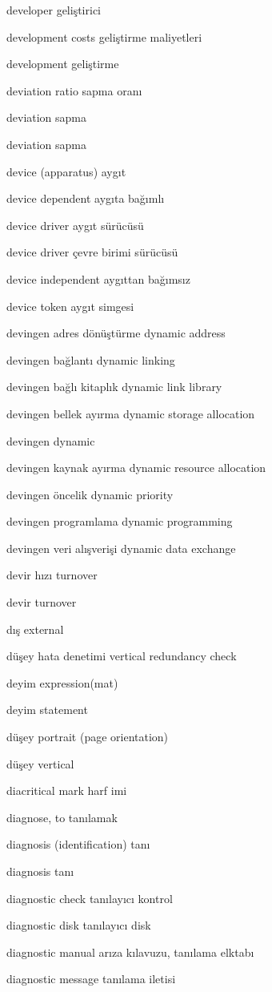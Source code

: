 \documentclass[12pt,fleqn]{article}\usepackage{../../common}
\begin{document}
developer geliştirici

development costs geliştirme maliyetleri

development geliştirme

deviation ratio sapma oranı

deviation sapma

deviation sapma

device (apparatus) aygıt

device dependent aygıta bağımlı

device driver aygıt sürücüsü

device driver çevre birimi sürücüsü

device independent aygıttan bağımsız

device token aygıt simgesi

devingen adres dönüştürme dynamic address

devingen bağlantı dynamic linking

devingen bağlı kitaplık dynamic link library

devingen bellek ayırma dynamic storage allocation

devingen dynamic

devingen kaynak ayırma dynamic resource allocation

devingen öncelik dynamic priority

devingen programlama dynamic programming

devingen veri alışverişi dynamic data exchange

devir hızı turnover

devir turnover

dış external

düşey hata denetimi vertical redundancy check

deyim expression(mat)

deyim statement

düşey portrait (page orientation)

düşey vertical

diacritical mark harf imi

diagnose, to tanılamak

diagnosis (identification) tanı

diagnosis tanı

diagnostic check tanılayıcı kontrol

diagnostic disk tanılayıcı disk

diagnostic manual arıza kılavuzu, tanılama elktabı

diagnostic message tanılama iletisi
\end{document}
